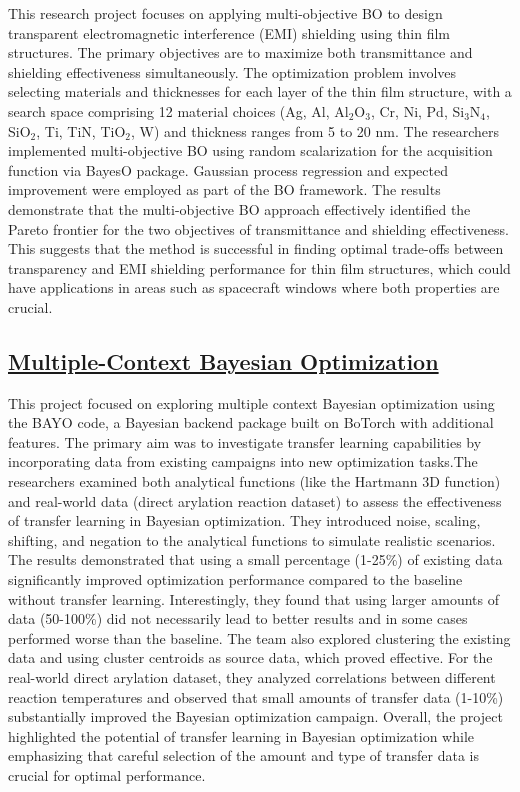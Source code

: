This research project focuses on applying multi-objective BO to design transparent electromagnetic interference (EMI) shielding using thin film structures\cite{li2022bayesian}. The primary objectives are to maximize both transmittance and shielding effectiveness simultaneously. The optimization problem involves selecting materials and thicknesses for each layer of the thin film structure, with a search space comprising 12 material choices (Ag, Al, Al$_2$O$_3$, Cr, Ni, Pd, Si$_3$N$_4$, SiO$_2$, Ti, TiN, TiO$_2$, W) and thickness ranges from 5 to 20 nm. The researchers implemented multi-objective BO using random scalarization for the acquisition function via BayesO package\cite{kim2023bayeso}. Gaussian process regression and expected improvement were employed as part of the BO framework. The results demonstrate that the multi-objective BO approach effectively identified the Pareto frontier for the two objectives of transmittance and shielding effectiveness. This suggests that the method is successful in finding optimal trade-offs between transparency and EMI shielding performance for thin film structures, which could have applications in areas such as spacecraft windows where both properties are crucial.
 \subsection*{\href{https://www.youtube.com/watch?v=wK266A0TvZ4}{Multiple-Context Bayesian Optimization}}

This project focused on exploring multiple context Bayesian optimization using the BAYO code, a Bayesian backend package built on BoTorch with additional features. The primary aim was to investigate transfer learning capabilities by incorporating data from existing campaigns into new optimization tasks.The researchers examined both analytical functions (like the Hartmann 3D function) and real-world data (direct arylation reaction dataset) to assess the effectiveness of transfer learning in Bayesian optimization. They introduced noise, scaling, shifting, and negation to the analytical functions to simulate realistic scenarios. The results demonstrated that using a small percentage (1-25\%) of existing data significantly improved optimization performance compared to the baseline without transfer learning. Interestingly, they found that using larger amounts of data (50-100\%) did not necessarily lead to better results and in some cases performed worse than the baseline. The team also explored clustering the existing data and using cluster centroids as source data, which proved effective. For the real-world direct arylation dataset, they analyzed correlations between different reaction temperatures and observed that small amounts of transfer data (1-10\%) substantially improved the Bayesian optimization campaign. Overall, the project highlighted the potential of transfer learning in Bayesian optimization while emphasizing that careful selection of the amount and type of transfer data is crucial for optimal performance.
